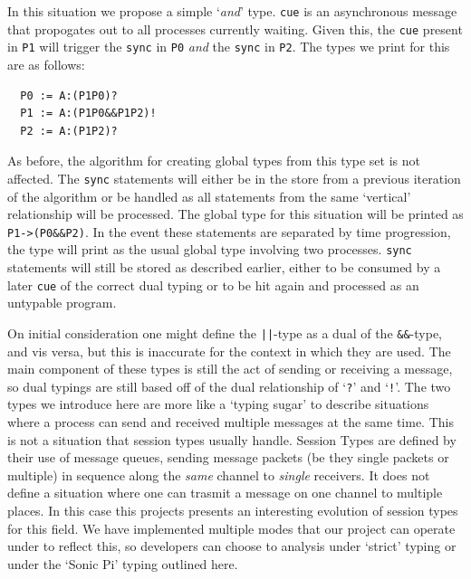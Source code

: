 \documentclass[11pt]{scrartcl}
\begin{document}
In this situation we propose a simple `\emph{and}' type. \texttt{cue} is an
asynchronous message that propogates out to all processes currently waiting.
Given this, the \texttt{cue} present in \texttt{P1} will trigger the \texttt{sync}
in \texttt{P0} \emph{and} the \texttt{sync} in \texttt{P2}. The types we 
print for this are as follows:
\\
\begin{lstlisting}
  P0 := A:(P1P0)?
  P1 := A:(P1P0&&P1P2)!
  P2 := A:(P1P2)?
\end{lstlisting}

As before, the algorithm for creating global types from this type set is not
affected. The \texttt{sync} statements will either be in the store from a previous
iteration of the algorithm or be handled as all statements from the same `vertical'
relationship will be processed. The global type for this situation will be printed
as \texttt{P1->(P0\&\&P2)}. In the event these statements are separated by time
progression, the type will print as the usual global type involving two processes.
\texttt{sync} statements will still be stored as described earlier, either to be
consumed by a later \texttt{cue} of the correct dual typing or to be hit again
and processed as an untypable program.

On initial consideration one might define the \texttt{||}-type as a dual of the
\texttt{\&\&}-type, and vis versa, but this is inaccurate for the context in which
they are used. The main component of these types is still the act of sending or
receiving a message, so dual typings are still based off of the dual relationship
of `\texttt{?}' and `\texttt{!}'. The two types we introduce here are more like
a `typing sugar' to describe situations where a process can send and received
multiple messages at the same time. This is not a situation that session types
usually handle. Session Types are defined by their use of message queues, sending
message packets (be they single packets or multiple) in sequence along the 
\emph{same} channel to \emph{single} receivers. It does not define a situation
where one can trasmit a message on one channel to multiple places. In this case
this projects presents an interesting evolution of session types for this field.
We have implemented multiple modes that our project can operate under to reflect
this, so developers can choose to analysis under `strict' typing or under the
`Sonic Pi' typing outlined here.
\end{document}

